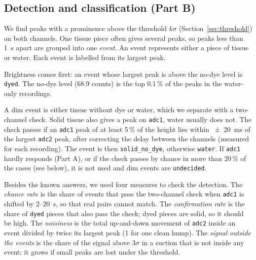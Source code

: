 \subsection{Detection and classification (Part B)}
\label{sec:detection-methods}
We find peaks with a prominence above the threshold $k\sigma$ (Section~\ref{sec:threshold})
on both channels. One tissue piece often gives
several peaks, so peaks less than \SI{1}{\second} apart are grouped into one \emph{event}. An
event represents either a piece of tissue or water. Each event is labelled from its largest peak.

Brightness comes first: an event whose largest peak is above the no-dye level is
\texttt{dyed}. The no-dye level (68.9 counts) is the top 0.1\,\% of the peaks in the water-only
recordings.

A dim event is either tissue without dye or water, which we separate with a two-channel check.
Solid tissue also gives a peak on \texttt{adc1}, water usually does not. The check passes if an
\texttt{adc1} peak of at least 5\,\% of the height lies within \SI{\pm 20}{\milli\second} of the
largest \texttt{adc2} peak, after correcting the delay between the channels (measured for each
recording). The event is then \texttt{solid\_no\_dye}, otherwise \texttt{water}. If \texttt{adc1}
hardly responds (Part A), or if the check passes by chance in more than 20\,\% of the cases (see
below), it is not used and dim events are \texttt{undecided}.

Besides the known answers, we used four measures to check the detection. The \emph{chance rate}
is the share of events that pass the two-channel check when \texttt{adc1} is shifted by
2--\SI{20}{\second}, so that real pairs cannot match. The \emph{confirmation rate} is the share
of \texttt{dyed} pieces that also pass the check; dyed pieces are solid, so it should be high.
The \emph{noisiness} is the total up-and-down movement of \texttt{adc2} inside an event divided
by twice its largest peak (1 for one clean hump). The \emph{signal outside the events} is the
share of the signal above $3\sigma$ in a suction that is not inside any event; it grows if small
peaks are lost under the threshold.
